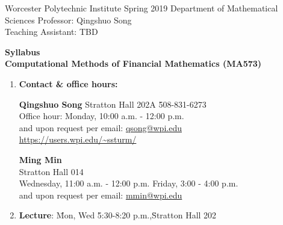 \documentclass[final, 12pt]{article}
\begin{document}
\flushleft
Worcester Polytechnic Institute  \hfill Spring 2019 
\linebreak
Department of Mathematical Sciences
\linebreak
Professor: Qingshuo Song \\
Teaching Assistant: TBD \\
\vspace{50pt}
\centering
   {%
   { \textbf{Syllabus}}  \\ ${}$\\ 
   {
    \textbf{Computational Methods of Financial Mathematics (MA573)}} \\ 
\vspace{20pt}

\vspace{20pt}
\flushright
\normalsize
\vspace{10pt}


\begin{enumerate}


\item
\textbf{Contact \& office hours:}
\begin{tabbing}
\textbf{Qingshuo Song} 
Stratton Hall 202A  
\qquad \qquad\qquad \qquad \qquad \qquad \= 508-831-6273\\
Office hour: 
Monday, 10:00 a.m. - 12:00 p.m. 
\\
and upon request per email: \href{mailto:qsong@wpi.edu}{qsong@wpi.edu}\\
 \url{https://users.wpi.edu/~ssturm/}
\end{tabbing}

\begin{tabbing}
	\textbf{Ming Min} \\
	Stratton Hall 014 \qquad \qquad\qquad \qquad \qquad \qquad \= \\
	Wednesday, 11:00 a.m. - 12:00 p.m.  \> Friday, 3:00 - 4:00 p.m. \\
	\qquad and upon request per email: \href{mailto:mmin@wpi.edu}{mmin@wpi.edu}
\end{tabbing}
\vspace{5pt}

\item
\begin{tabbing}
\textbf{Lecture}: \qquad \=Mon, Wed \qquad \=5:30-8:20 p.m.,\qquad\=Stratton Hall 202\=\\
\end{tabbing}

\vspace{5pt}


\end{enumerate}}
\end{document}
